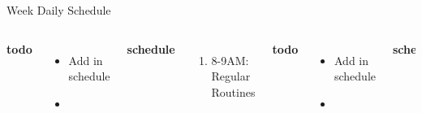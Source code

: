 \documentclass[serif, mathserif, final]{beamer}
\begin{document}
\begin{frame}
\begin{columns}
\begin{column}{0.5\linewidth}
\begin{block}{Week Daily Schedule}
\begin{columns}
        {\small \bf todo} \\ 
        \begin{itemize}
          \tiny \item \tiny Add in schedule
        \item \tiny 
        \end{itemize} 
        {\small \bf schedule} \\
        \begin{enumerate} 
          \tiny \item \tiny 8-9AM: Regular Routines 
        \end{enumerate} 
         {\small \bf todo} \\ 
        \begin{itemize}
          \tiny \item \tiny Add in schedule
        \item \tiny 
        \end{itemize} 
            {\small \bf schedule} \\
        \begin{enumerate} 
          \tiny \item \tiny 8-9AM: Regular Routines 
        \end{enumerate}
        { \small \bf todo} \\ 
        \begin{itemize}
          \tiny \item \tiny Add in schedule
        \item \tiny 
        \end{itemize} 
        {\small \bf schedule} \\
        \begin{enumerate} 
          \tiny \item \tiny 8-9AM: Regular Routines 
        \end{enumerate}

        {\small \bf todo}\\ 
        \begin{itemize}
          \tiny \item \tiny Add in schedule
        \end{itemize} 
            {\small \bf schedule}\\
        \begin{enumerate} 
          \tiny \item \tiny 8-9AM: Regular Routines 
        \end{enumerate}
    \end{columns}
  \end{block}
\end{column}


\end{columns}
\end{frame}
\end{document}
